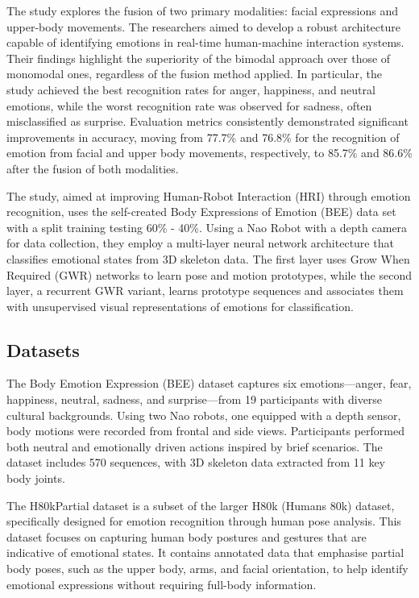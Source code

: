 The study explores the fusion of two primary modalities: facial expressions and upper-body movements. The researchers aimed to develop a robust architecture capable of identifying emotions in real-time human-machine interaction systems. Their findings highlight the superiority of the bimodal approach over those of monomodal ones, regardless of the fusion method applied. In particular, the study achieved the best recognition rates for anger, happiness, and neutral emotions, while the worst recognition rate was observed for sadness, often misclassified as surprise. Evaluation metrics consistently demonstrated significant improvements in accuracy, moving from 77.7\% and 76.8\% for the recognition of emotion from facial and upper body movements, respectively, to 85.7\% and 86.6\% after the fusion of both modalities.

The study, aimed at improving Human-Robot Interaction (HRI) through emotion recognition, uses the self-created Body Expressions of Emotion (BEE) data set with a split training testing 60\% - 40\%. Using a Nao Robot with a depth camera for data collection, they employ a multi-layer neural network architecture that classifies emotional states from 3D skeleton data. The first layer uses Grow When Required (GWR) networks to learn pose and motion prototypes, while the second layer, a recurrent GWR variant, learns prototype sequences and associates them with unsupervised visual representations of emotions for classification.

\subsection{Datasets}
The Body Emotion Expression (BEE) dataset \cite{Elfaramawy2017-ab} captures six emotions—anger, fear, happiness, neutral, sadness, and surprise—from 19 participants with diverse cultural backgrounds. Using two Nao robots, one equipped with a depth sensor, body motions were recorded from frontal and side views. Participants performed both neutral and emotionally driven actions inspired by brief scenarios. The dataset includes 570 sequences, with 3D skeleton data extracted from 11 key body joints.

The H80kPartial dataset \cite{8578328} is a subset of the larger H80k (Humans 80k) dataset, specifically designed for emotion recognition through human pose analysis. This dataset focuses on capturing human body postures and gestures that are indicative of emotional states. It contains annotated data that emphasise partial body poses, such as the upper body, arms, and facial orientation, to help identify emotional expressions without requiring full-body information.

